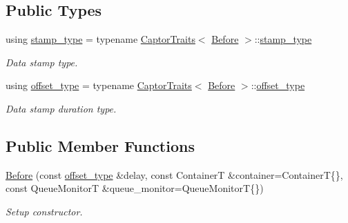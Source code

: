 \subsection*{Public Types}
\begin{DoxyCompactItemize}
\item 
\mbox{\label{classflow_1_1follower_1_1_before_afd0adcf4c1d76dce28f8856f25347aa7}} 
using \hyperlink{classflow_1_1follower_1_1_before_afd0adcf4c1d76dce28f8856f25347aa7}{stamp\+\_\+type} = typename \hyperlink{structflow_1_1_captor_traits}{Captor\+Traits}$<$ \hyperlink{classflow_1_1follower_1_1_before}{Before} $>$\+::\hyperlink{classflow_1_1follower_1_1_before_afd0adcf4c1d76dce28f8856f25347aa7}{stamp\+\_\+type}
\begin{DoxyCompactList}\small\item\em Data stamp type. \end{DoxyCompactList}\item 
\mbox{\label{classflow_1_1follower_1_1_before_a5bb9194263576cac18c7e602ab33e7b4}} 
using \hyperlink{classflow_1_1follower_1_1_before_a5bb9194263576cac18c7e602ab33e7b4}{offset\+\_\+type} = typename \hyperlink{structflow_1_1_captor_traits}{Captor\+Traits}$<$ \hyperlink{classflow_1_1follower_1_1_before}{Before} $>$\+::\hyperlink{classflow_1_1follower_1_1_before_a5bb9194263576cac18c7e602ab33e7b4}{offset\+\_\+type}
\begin{DoxyCompactList}\small\item\em Data stamp duration type. \end{DoxyCompactList}\end{DoxyCompactItemize}
\subsection*{Public Member Functions}
\begin{DoxyCompactItemize}
\item 
\hyperlink{classflow_1_1follower_1_1_before_a8245d0990db036bd525f3534ef7876bb}{Before} (const \hyperlink{classflow_1_1follower_1_1_before_a5bb9194263576cac18c7e602ab33e7b4}{offset\+\_\+type} \&delay, const ContainerT \&container=ContainerT\{\}, const Queue\+MonitorT \&queue\+\_\+monitor=Queue\+MonitorT\{\})
\begin{DoxyCompactList}\small\item\em Setup constructor. \end{DoxyCompactList}\end{DoxyCompactItemize}
